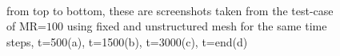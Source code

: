 \documentclass[preprint,authoryear,12pt]{elsarticle}
\begin{document}
\begin{figure}
\centering
{}\\[2mm]%
\\[2mm]%
\\[2mm]%
%
\caption{from top to bottom, these are screenshots taken from the test-case of MR=$100$ using fixed and unstructured mesh for the same time steps, t=500(a), t=1500(b), t=3000(c), t=end(d)}
\label{fig:4testcase}
\end{figure}
\end{document}
